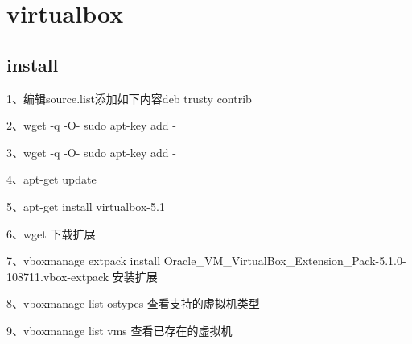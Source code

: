 \documentclass[a4paper,10pt,english]{sphinxmanual}
\begin{document}
\section{virtualbox}
\label{\detokenize{linux/virtualbox::doc}}\label{\detokenize{linux/virtualbox:virtualbox}}

\subsection{install}
\label{\detokenize{linux/virtualbox:install}}
\begin{DUlineblock}{0em}
\item[] 1、编辑source.list添加如下内容deb  trusty contrib
\item[] 2、wget -q  -O- \textbar{} sudo apt-key add -
\item[] 3、wget -q  -O- \textbar{} sudo apt-key add -
\item[] 4、apt-get update
\item[] 5、apt-get install virtualbox-5.1
\item[] 6、wget  下载扩展
\item[] 7、vboxmanage extpack install Oracle\_VM\_VirtualBox\_Extension\_Pack-5.1.0-108711.vbox-extpack 安装扩展
\item[] 8、vboxmanage list ostypes 查看支持的虚拟机类型
\item[] 9、vboxmanage list vms 查看已存在的虚拟机
\end{DUlineblock}
\end{document}
